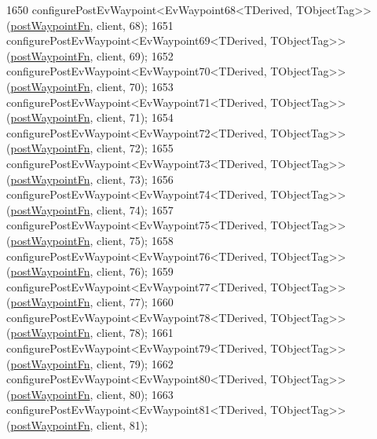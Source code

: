 \begin{DoxyCode}
1650     configurePostEvWaypoint<EvWaypoint68<TDerived, TObjectTag>>(\hyperlink{classcl__move__base__z_1_1WaypointEventDispatcher_a964a57fcce5d48ec60243230722d8dd7}{postWaypointFn}, client, 68);
1651     configurePostEvWaypoint<EvWaypoint69<TDerived, TObjectTag>>(\hyperlink{classcl__move__base__z_1_1WaypointEventDispatcher_a964a57fcce5d48ec60243230722d8dd7}{postWaypointFn}, client, 69);
1652     configurePostEvWaypoint<EvWaypoint70<TDerived, TObjectTag>>(\hyperlink{classcl__move__base__z_1_1WaypointEventDispatcher_a964a57fcce5d48ec60243230722d8dd7}{postWaypointFn}, client, 70);
1653     configurePostEvWaypoint<EvWaypoint71<TDerived, TObjectTag>>(\hyperlink{classcl__move__base__z_1_1WaypointEventDispatcher_a964a57fcce5d48ec60243230722d8dd7}{postWaypointFn}, client, 71);
1654     configurePostEvWaypoint<EvWaypoint72<TDerived, TObjectTag>>(\hyperlink{classcl__move__base__z_1_1WaypointEventDispatcher_a964a57fcce5d48ec60243230722d8dd7}{postWaypointFn}, client, 72);
1655     configurePostEvWaypoint<EvWaypoint73<TDerived, TObjectTag>>(\hyperlink{classcl__move__base__z_1_1WaypointEventDispatcher_a964a57fcce5d48ec60243230722d8dd7}{postWaypointFn}, client, 73);
1656     configurePostEvWaypoint<EvWaypoint74<TDerived, TObjectTag>>(\hyperlink{classcl__move__base__z_1_1WaypointEventDispatcher_a964a57fcce5d48ec60243230722d8dd7}{postWaypointFn}, client, 74);
1657     configurePostEvWaypoint<EvWaypoint75<TDerived, TObjectTag>>(\hyperlink{classcl__move__base__z_1_1WaypointEventDispatcher_a964a57fcce5d48ec60243230722d8dd7}{postWaypointFn}, client, 75);
1658     configurePostEvWaypoint<EvWaypoint76<TDerived, TObjectTag>>(\hyperlink{classcl__move__base__z_1_1WaypointEventDispatcher_a964a57fcce5d48ec60243230722d8dd7}{postWaypointFn}, client, 76);
1659     configurePostEvWaypoint<EvWaypoint77<TDerived, TObjectTag>>(\hyperlink{classcl__move__base__z_1_1WaypointEventDispatcher_a964a57fcce5d48ec60243230722d8dd7}{postWaypointFn}, client, 77);
1660     configurePostEvWaypoint<EvWaypoint78<TDerived, TObjectTag>>(\hyperlink{classcl__move__base__z_1_1WaypointEventDispatcher_a964a57fcce5d48ec60243230722d8dd7}{postWaypointFn}, client, 78);
1661     configurePostEvWaypoint<EvWaypoint79<TDerived, TObjectTag>>(\hyperlink{classcl__move__base__z_1_1WaypointEventDispatcher_a964a57fcce5d48ec60243230722d8dd7}{postWaypointFn}, client, 79);
1662     configurePostEvWaypoint<EvWaypoint80<TDerived, TObjectTag>>(\hyperlink{classcl__move__base__z_1_1WaypointEventDispatcher_a964a57fcce5d48ec60243230722d8dd7}{postWaypointFn}, client, 80);
1663     configurePostEvWaypoint<EvWaypoint81<TDerived, TObjectTag>>(\hyperlink{classcl__move__base__z_1_1WaypointEventDispatcher_a964a57fcce5d48ec60243230722d8dd7}{postWaypointFn}, client, 81);

\end{DoxyCode}
